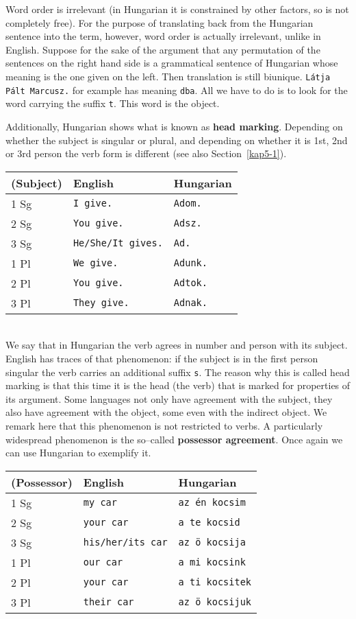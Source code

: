Word order is irrelevant (in Hungarian it is constrained by other
factors, so is not completely free). For the purpose of
translating back from the Hungarian sentence into the term,
however, word order is actually irrelevant, unlike in English.
Suppose for the sake of the argument that any permutation of the
sentences on the right hand side is a grammatical sentence of
Hungarian whose meaning is the one given on the left. Then
translation is still biunique. {\tt L\'atja P\'alt Marcusz.} for
example has meaning {\tt dba}. All we have to do is to look for
the word carrying the suffix {\tt t}. This word is the object.

Additionally, Hungarian shows what is known as {\bf head marking}.
Depending on whether the subject is singular or plural, and
depending on whether it is 1st, 2nd or 3rd person the verb form is
different (see also Section~\ref{kap5-1}).
\\[2mm]
\begin{tabular}{l|l|l}
(Subject) & English & Hungarian \\\hline%
1 Sg & {\tt I give.} & {\tt Adom.} \\
2 Sg & {\tt You give.} & {\tt Adsz.} \\
3 Sg & {\tt He/She/It gives.} & {\tt Ad.} \\
1 Pl & {\tt We give.} & {\tt Adunk.} \\
2 Pl & {\tt You give.} & {\tt Adtok.} \\
3 Pl & {\tt They give.} & {\tt Adnak.}
\end{tabular}
\\[2mm]
We say that in Hungarian the verb agrees in number and person with
its subject. %
English has traces of that phenomenon: if the
subject is in the first person singular the verb carries an
additional suffix {\tt s}. The reason why this is called head
marking is that this time it is the head (the verb) that is marked
for properties of its argument. Some languages not only have
agreement with the subject, they also have agreement with the
object, some even with the indirect object. We remark here that
this phenomenon is not restricted to verbs. A particularly
widespread phenomenon is the so--called {\bf possessor agreement}.
Once again we can use Hungarian to exemplify it.
\begin{center}
\begin{tabular}{l|l|l}
(Possessor) & English & Hungarian \\\hline%
1 Sg & {\tt my car} & {\tt az \'en kocsim} \\
2 Sg & {\tt your car} & {\tt a te kocsid} \\
3 Sg & {\tt his/her/its car} & {\tt az \"o kocsija} \\
1 Pl & {\tt our car} & {\tt a mi kocsink} \\
2 Pl & {\tt your car} & {\tt a ti kocsitek} \\
3 Pl & {\tt their car} & {\tt az \"o kocsijuk}
\end{tabular}
\end{center}
